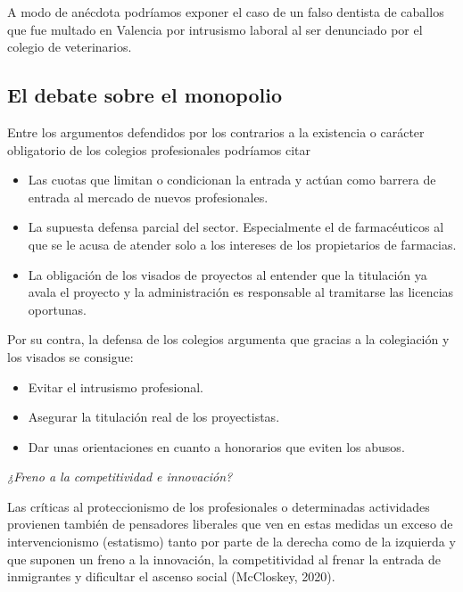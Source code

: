 \documentclass[
]{article}
\providecommand{\tightlist}{%
  \setlength{\itemsep}{0pt}\setlength{\parskip}{0pt}}
\begin{document}
A modo de anécdota podríamos exponer el caso de un falso dentista de
caballos que fue multado en Valencia por intrusismo laboral al ser
denunciado por el colegio de veterinarios.

\hypertarget{el-debate-sobre-el-monopolio}{%
\subsection*{El debate sobre el
monopolio}\label{el-debate-sobre-el-monopolio}}

Entre los argumentos defendidos por los contrarios a la existencia o
carácter obligatorio de los colegios profesionales podríamos citar

\begin{itemize}
\tightlist
\item
  Las cuotas que limitan o condicionan la entrada y actúan como barrera
  de entrada al mercado de nuevos profesionales.
\end{itemize}

\begin{itemize}
\item
  La supuesta defensa parcial del sector. Especialmente el de
  farmacéuticos al que se le acusa de atender solo a los intereses de
  los propietarios de farmacias.
\item
  La obligación de los visados de proyectos al entender que la
  titulación ya avala el proyecto y la administración es responsable al
  tramitarse las licencias oportunas.
\end{itemize}

Por su contra, la defensa de los colegios argumenta que gracias a la
colegiación y los visados se consigue:

\begin{itemize}
\item
  Evitar el intrusismo profesional.
\item
  Asegurar la titulación real de los proyectistas.
\item
  Dar unas orientaciones en cuanto a honorarios que eviten los abusos.
\end{itemize}

\emph{¿Freno a la competitividad e innovación?}

Las críticas al proteccionismo de los profesionales o determinadas
actividades provienen también de pensadores liberales que ven en estas
medidas un exceso de intervencionismo (estatismo) tanto por parte de la
derecha como de la izquierda y que suponen un freno a la innovación, la
competitividad al frenar la entrada de inmigrantes y dificultar el
ascenso social (McCloskey, 2020).
\end{document}
